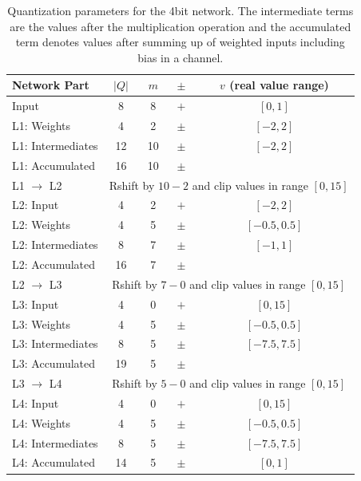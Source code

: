 \begin{table}[hbt]
  \centering
  \begin{tabular}{lcccc}
	\toprule
    Network Part 	  & $|Q|$ & $m$ & $\pm$ & $v$ (real value range) \\
	\midrule
    Input 		 	  &  8    & 8  & $+$   & $[0,1]  $ \\
    L1: Weights 	  &  4    & 2  & $\pm$ & $[-2,2] $ \\
    L1: Intermediates & 12    & 10 & $\pm$ & $[-2,2] $ \\
    L1: Accumulated   & 16    & 10 & $\pm$ & 		   \\
    \midrule
    L1 $\to$ L2 	  & \multicolumn{4}{c}{Rshift by $10-2$ and clip values in range $[0,15]$} \\
    \midrule
    L2: Input 		  &  4    & 2  & $+$   & $[-2,2] $ 	   \\
    L2: Weights 	  &  4    & 5  & $\pm$ & $[-0.5,0.5] $ \\
    L2: Intermediates &  8    & 7  & $\pm$ & $[-1,1] $ \\
    L2: Accumulated   & 16    & 7  & $\pm$ &  			   \\
    \midrule
    L2 $\to$ L3 	  & \multicolumn{4}{c}{Rshift by $7-0$ and clip values in range $[0,15]$} \\
    \midrule
    L3: Input 		  &  4    & 0  & $+$   & $[0,15] $     \\
    L3: Weights 	  &  4    & 5  & $\pm$ & $[-0.5,0.5] $ \\
    L3: Intermediates &  8    & 5  & $\pm$ & $[-7.5,7.5] $ \\
    L3: Accumulated   & 19    & 5  & $\pm$ &               \\
    \midrule
    L3 $\to$ L4 	  & \multicolumn{4}{c}{Rshift by $5-0$ and clip values in range $[0,15]$} \\
    \midrule
    L4: Input 		  &  4    & 0  & $+$   & $[0,15] $ \\
    L4: Weights 	  &  4    & 5  & $\pm$ & $[-0.5,0.5] $ \\
    L4: Intermediates &  8    & 5  & $\pm$ & $[-7.5,7.5] $ \\
    L4: Accumulated   & 14    & 5  & $\pm$ & $[0,1] $ \\
    \bottomrule
  \end{tabular}
  \caption[Quantization parameters for the 4bit network]{Quantization parameters for the 4bit network. The intermediate terms are the values after the multiplication operation and the accumulated term denotes values after summing up of weighted inputs including bias in a channel.}
  \label{tab:quantization-linear-params}
\end{table}


